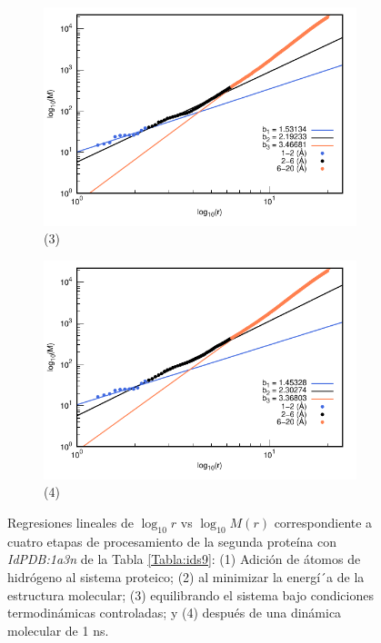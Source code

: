 \begin{figure}[H]
	\vspace{0cm} %
	
	\hspace{-0.3cm} 
	\begin{subfigure}{0.49\textwidth}
		\centering
		\includegraphics[width=\linewidth,page=1]{graphs/PDBs/1a3n/1a3nEq.pdf}
		\caption{(3)}
	\end{subfigure}
	\hspace{0.2cm}
	\begin{subfigure}{0.49\textwidth} %
		\centering
		\includegraphics[width=\linewidth,page=1]{graphs/PDBs/1a3n/1a3n1ns.pdf}
		\caption{(4)}
	\end{subfigure}
	\caption{Regresiones lineales de $\log_{10}r$ vs $\log_{10}M(r)$ correspondiente a cuatro etapas de procesamiento de la segunda prote\'{i}na con \textit{IdPDB:1a3n} de la Tabla \ref{Tabla:ids9}: (1) Adici\'{o}n de \'{a}tomos de hidr\'{o}geno al sistema proteico; (2) al minimizar la energ\'{i´}a de la estructura molecular; (3) equilibrando el sistema bajo condiciones termodin\'{a}micas controladas; y (4) despu\'{e}s de una din\'{a}mica molecular de 1 ns.}
	\label{fig:1a3n}
\end{figure}

